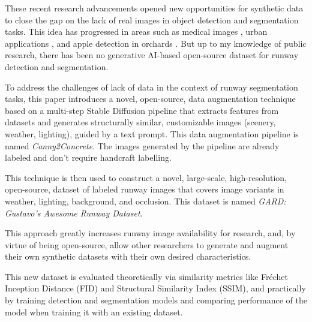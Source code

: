 These recent research advancements opened new opportunities for synthetic data to close the gap on the lack of real images in object detection and segmentation tasks. This idea has progressed in areas such as medical images \cite{saragih_using_2024}, urban applications \cite{reutov_generating_2023}, and apple detection in orchards \cite{voetman_big_2023}. But up to my knowledge of public research, there has been no generative AI-based open-source dataset for runway detection and segmentation.

To address the challenges of lack of data in the context of runway segmentation tasks, this paper introduces a novel, open-source, data augmentation technique based on a multi-step Stable Diffusion pipeline that extracts features from datasets and generates structurally similar, customizable images (scenery, weather, lighting), guided by a text prompt. This data augmentation pipeline is named \emph{Canny2Concrete}. The images generated by the pipeline are already labeled and don't require handcraft labelling.

This technique is then used to construct a novel, large-scale, high-resolution, open-source, dataset of labeled runway images that covers image variants in weather, lighting, background, and occlusion. This dataset is named \emph{GARD: Gustavo's Awesome Runway Dataset}.

This approach greatly increases runway image availability for research, and, by virtue of being open-source, allow other researchers to generate and augment their own synthetic datasets with their own desired characteristics.

This new dataset is evaluated theoretically via similarity metrics like Fréchet Inception Distance (FID) and Structural Similarity Index (SSIM), and practically by training detection and segmentation models and comparing performance of the model when training it with an existing dataset.
